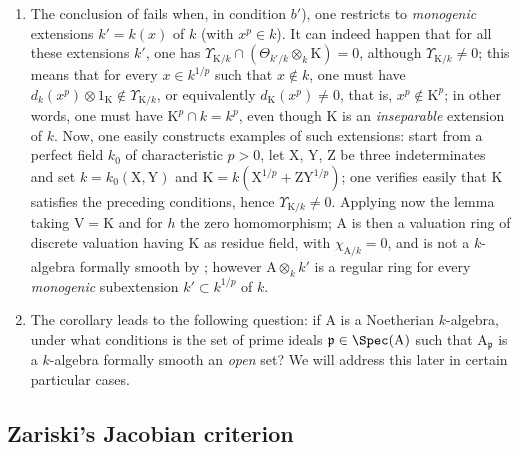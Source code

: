 \begin{remark}[22.5.10]
\label{0.22.5.10}
\begin{enumerate}
  \item[\rm{(i)}] The conclusion of  fails when, in condition $b'$), one restricts to \emph{monogenic} extensions $k'=k(x)$ of $k$ (with $x^p\in k$).
  It can indeed happen that for all these extensions $k'$, one has $\Upsilon_{\mathrm{K}/k}\cap(\Theta_{k'/k}\otimes_k\mathrm{K})=0$, although $\Upsilon_{\mathrm{K}/k}\neq 0$; this means that for every $x\in k^{1/p}$ such that $x\notin k$, one must have $d_k(x^p)\otimes 1_\mathrm{K}\notin\Upsilon_{\mathrm{K}/k}$, or equivalently $d_\mathrm{K}(x^p)\neq 0$, that is, $x^p\notin\mathrm{K}^p$; in other words, one must have $\mathrm{K}^p\cap k=k^p$, even though $\mathrm{K}$ is an \emph{inseparable} extension of $k$.
  Now, one easily constructs examples of such extensions: start from a perfect field $k_0$ of characteristic $p>0$, let $\mathrm{X}$, $\mathrm{Y}$, $\mathrm{Z}$ be three indeterminates and set $k=k_0(\mathrm{X},\mathrm{Y})$ and $\mathrm{K}=k(\mathrm{X}^{1/p}+\mathrm{Z}\mathrm{Y}^{1/p})$; one verifies easily that $\mathrm{K}$ satisfies the preceding conditions, hence $\Upsilon_{\mathrm{K}/k}\neq 0$.
  Applying now the lemma  taking $\mathrm{V}=\mathrm{K}$ and for $h$ the zero homomorphism; $\mathrm{A}$ is then a valuation ring of discrete valuation having $\mathrm{K}$ as residue field, with $\chi_{\mathrm{A}/k}=0$, and is not a $k$-algebra formally smooth by ; however $\mathrm{A}\otimes_kk'$ is a regular ring for every \emph{monogenic} subextension $k'\subset k^{1/p}$ of $k$.
  \item[\rm{(ii)}] The corollary  leads to the following question: if $\mathrm{A}$ is a Noetherian $k$-algebra, under what conditions is the set of prime ideals $\mathfrak{p}\in\Spec(\mathrm{A})$ such that $\mathrm{A}_\mathfrak{p}$ is a $k$-algebra formally smooth an \emph{open} set?
  We will address this later in certain particular cases.
\end{enumerate}
\end{remark}

\subsection{Zariski's Jacobian criterion}
\label{subsection:0.22.6}


